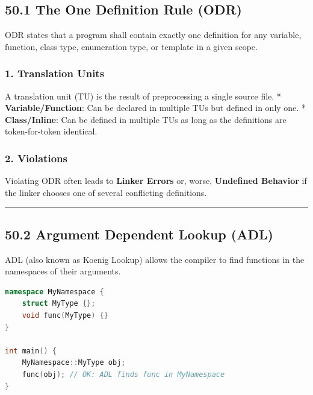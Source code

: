 \hypertarget{the-one-definition-rule-odr}{%
\subsection{50.1 The One Definition Rule
(ODR)}\label{the-one-definition-rule-odr}}

ODR states that a program shall contain exactly one definition for any
variable, function, class type, enumeration type, or template in a given
scope.

\hypertarget{translation-units}{%
\subsubsection{1. Translation Units}\label{translation-units}}

A translation unit (TU) is the result of preprocessing a single source
file. * \textbf{Variable/Function}: Can be declared in multiple TUs but
defined in only one. * \textbf{Class/Inline}: Can be defined in multiple
TUs as long as the definitions are token-for-token identical.

\hypertarget{violations}{%
\subsubsection{2. Violations}\label{violations}}

Violating ODR often leads to \textbf{Linker Errors} or, worse,
\textbf{Undefined Behavior} if the linker chooses one of several
conflicting definitions.

\begin{center}\rule{0.5\linewidth}{0.5pt}\end{center}

\hypertarget{argument-dependent-lookup-adl}{%
\subsection{50.2 Argument Dependent Lookup
(ADL)}\label{argument-dependent-lookup-adl}}

ADL (also known as Koenig Lookup) allows the compiler to find functions
in the namespaces of their arguments.

\begin{lstlisting}[language={C++}]
namespace MyNamespace {
    struct MyType {};
    void func(MyType) {}
}

int main() {
    MyNamespace::MyType obj;
    func(obj); // OK: ADL finds func in MyNamespace
}
\end{lstlisting}

